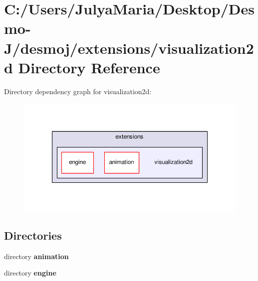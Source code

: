 \section{C\-:/\-Users/\-Julya\-Maria/\-Desktop/\-Desmo-\/\-J/desmoj/extensions/visualization2d Directory Reference}
\label{dir_46f12bc0732c0bd7e88ab0685fd9848e}
Directory dependency graph for visualization2d\-:
\nopagebreak
\begin{figure}[H]
\begin{center}
\leavevmode
\includegraphics[width=350pt]{dir_46f12bc0732c0bd7e88ab0685fd9848e_dep}
\end{center}
\end{figure}
\subsection*{Directories}
\begin{DoxyCompactItemize}
\item 
directory {\bf animation}
\item 
directory {\bf engine}
\end{DoxyCompactItemize}
